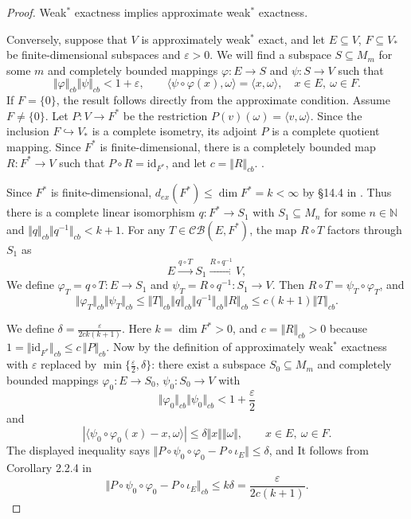 \documentclass[12pt]{article}
\theoremstyle{definition}
\theoremstyle{remark}
\begin{document}
\begin{proof}
Weak$^{*}$ exactness implies approximate weak$^{*}$ exactness.

Conversely, suppose that $V$ is approximately weak$^{*}$
exact, and let $E\subseteq V$, $F\subseteq V_*$ be finite-dimensional
subspaces and $\varepsilon>0$. We will find a subspace
$S\subseteq M_m$ for some $m$ and completely bounded mappings
$\varphi:E\to S$ and $\psi:S\to V$ such that
\[
\Vert\varphi\Vert_{cb}\Vert\psi\Vert_{cb}<1+\varepsilon,
\qquad
\langle\psi\circ\varphi(x),\omega\rangle=\langle x,\omega\rangle,
\quad x\in E,\ \omega\in F.
\]
If $F=\{0\}$, the result follows directly from the approximate condition.
Assume $F\ne\{0\}$. 
Let $P:V\to F^*$ be the restriction $P(v)(\omega)=\langle v,\omega\rangle$.
Since the inclusion $F\hookrightarrow V_*$ is a complete isometry, its
adjoint $P$ is a complete quotient mapping. Since $F^*$ is finite-dimensional, there is a completely bounded map
$R:F^*\to V$ such that $P\circ R=\mathrm{id}_{F^*}$, and let $c=\Vert R\Vert_{cb}$.
.


Since $F^*$ is finite-dimensional, $d_{ex}(F^*)\leq\dim F^{*}=k<\infty$ by \S 14.4 in 
\cite{ER00}. Thus there is  a complete linear isomorphism $q:F^*\to S_1$
with $S_1\subseteq M_n$ for some $n\in\mathbb{N}$ and
$\Vert q\Vert_{cb}\Vert q^{-1}\Vert_{cb}<k+1$. For any
$T\in\mathcal{CB}(E,F^*)$, the map $R\circ T$ factors through $S_1$ as
\[
E\xrightarrow{q\circ T}S_1\xrightarrow{R\circ q^{-1}}V,
\]
We define $\varphi_T=q\circ T:E\to S_1$ and $\psi_T=R\circ q^{-1}:S_1\to V$.
Then $R\circ T=\psi_T\circ\varphi_T$, and
\begin{equation}\label{eq:exLcomp}
\Vert\varphi_T\Vert_{cb}\Vert\psi_T\Vert_{cb}
\le\Vert T\Vert_{cb}\Vert q\Vert_{cb}\Vert q^{-1}\Vert_{cb}\Vert R\Vert_{cb}
\le c(k+1)\Vert T\Vert_{cb}.
\end{equation}

We define $\delta=\frac{\varepsilon}{2ck(k+1)}$. Here $k=\dim F^{*}>0$,
and $c=\Vert R\Vert_{cb}>0$ because
$1=\Vert\mathrm{id}_{F^*}\Vert_{cb}\le c\,\Vert P\Vert_{cb}$.
 Now by the definition of approximately
weak$^{*}$ exactness with $\varepsilon$ replaced by $\min\{\frac{\varepsilon}{2},\delta\}$:
there exist a subspace $S_0\subseteq M_m$ and completely bounded
mappings $\varphi_0:E\to S_0$, $\psi_0:S_0\to V$ with
\[
\Vert\varphi_0\Vert_{cb}\Vert\psi_0\Vert_{cb}<1+\frac{\varepsilon}{2}
\]
and
\[
|\langle\psi_0\circ\varphi_0(x)-x,\omega\rangle|
\le\delta\Vert x\Vert\Vert\omega\Vert,
\qquad x\in E,\ \omega\in F.
\]
The displayed inequality says
$\Vert P\circ\psi_0\circ\varphi_0-P\circ\iota_E\Vert\le\delta$, and It follows from Corollary 2.2.4 in 
\cite{ER00} 
\[
\Vert P\circ\psi_0\circ\varphi_0-P\circ\iota_E\Vert_{cb}\le k\delta
=\frac{\varepsilon}{2c(k+1)}.
\]





\end{proof}
\end{document}
